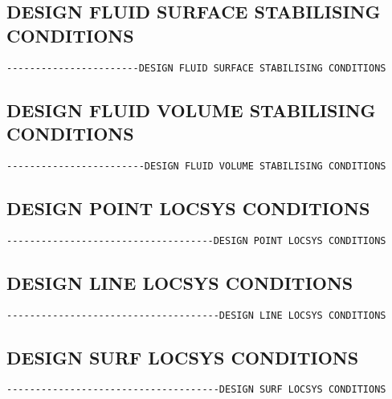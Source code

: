 \subsection{DESIGN FLUID SURFACE STABILISING CONDITIONS}
\begin{verbatim}
-----------------------DESIGN FLUID SURFACE STABILISING CONDITIONS
\end{verbatim}


\subsection{DESIGN FLUID VOLUME STABILISING CONDITIONS}
\begin{verbatim}
------------------------DESIGN FLUID VOLUME STABILISING CONDITIONS
\end{verbatim}


\subsection{DESIGN POINT LOCSYS CONDITIONS}
\begin{verbatim}
------------------------------------DESIGN POINT LOCSYS CONDITIONS
\end{verbatim}


\subsection{DESIGN LINE LOCSYS CONDITIONS}
\begin{verbatim}
-------------------------------------DESIGN LINE LOCSYS CONDITIONS
\end{verbatim}


\subsection{DESIGN SURF LOCSYS CONDITIONS}
\begin{verbatim}
-------------------------------------DESIGN SURF LOCSYS CONDITIONS
\end{verbatim}

